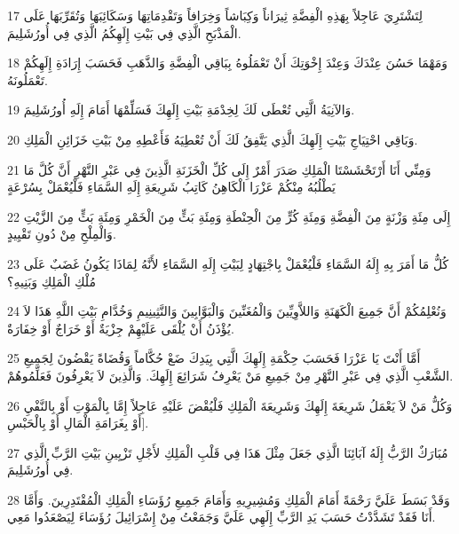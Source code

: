 \par 17 لِتَشْتَرِيَ عَاجِلاً بِهَذِهِ الْفِضَّةِ ثِيرَاناً وَكِبَاشاً وَخِرَافاً وَتَقْدِمَاتِهَا وَسَكَائِبَهَا وَتُقَرِّبَهَا عَلَى الْمَذْبَحِ الَّذِي فِي بَيْتِ إِلَهِكُمُ الَّذِي فِي أُورُشَلِيمَ.
\par 18 وَمَهْمَا حَسُنَ عِنْدَكَ وَعِنْدَ إِخْوَتِكَ أَنْ تَعْمَلُوهُ بِبَاقِي الْفِضَّةِ وَالذَّهَبِ فَحَسَبَ إِرَادَةِ إِلَهِكُمْ تَعْمَلُونَهُ.
\par 19 وَالآنِيَةُ الَّتِي تُعْطَى لَكَ لِخِدْمَةِ بَيْتِ إِلَهِكَ فَسَلِّمْهَا أَمَامَ إِلَهِ أُورُشَلِيمَ.
\par 20 وَبَاقِي احْتِيَاجِ بَيْتِ إِلَهِكَ الَّذِي يَتَّفِقُ لَكَ أَنْ تُعْطِيَهُ فَأَعْطِهِ مِنْ بَيْتِ خَزَائِنِ الْمَلِكِ.
\par 21 وَمِنِّي أَنَا أَرْتَحْشَسْتَا الْمَلِكِ صَدَرَ أَمْرٌ إِلَى كُلِّ الْخَزَنَةِ الَّذِينَ فِي عَبْرِ النَّهْرِ أَنَّ كُلَّ مَا يَطْلُبُهُ مِنْكُمْ عَزْرَا الْكَاهِنُ كَاتِبُ شَرِيعَةِ إِلَهِ السَّمَاءِ فَلْيُعْمَلْ بِسُرْعَةٍ
\par 22 إِلَى مِئَةِ وَزْنَةٍ مِنَ الْفِضَّةِ وَمِئَةِ كُرٍّ مِنَ الْحِنْطَةِ وَمِئَةِ بَثٍّ مِنَ الْخَمْرِ وَمِئَةِ بَثٍّ مِنَ الزَّيْتِ وَالْمِلْحِ مِنْ دُونِ تَقْيِيدٍ.
\par 23 كُلُّ مَا أَمَرَ بِهِ إِلَهُ السَّمَاءِ فَلْيُعْمَلْ بِاجْتِهَادٍ لِبَيْتِ إِلَهِ السَّمَاءِ لأَنَّهُ لِمَاذَا يَكُونُ غَضَبٌ عَلَى مُلْكِ الْمَلِكِ وَبَنِيهِ؟
\par 24 وَنُعْلِمُكُمْ أَنَّ جَمِيعَ الْكَهَنَةِ وَاللاَّوِيِّينَ وَالْمُغَنِّينَ وَالْبَوَّابِينَ وَالنَّثِينِيمِ وَخُدَّامِ بَيْتِ اللَّهِ هَذَا لاَ يُؤْذَنُ أَنْ يُلْقَى عَلَيْهِمْ جِزْيَةٌ أَوْ خَرَاجٌ أَوْ خِفَارَةٌ.
\par 25 أَمَّا أَنْتَ يَا عَزْرَا فَحَسَبَ حِكْمَةِ إِلَهِكَ الَّتِي بِيَدِكَ ضَعْ حُكَّاماً وَقُضَاةً يَقْضُونَ لِجَمِيعِ الشَّعْبِ الَّذِي فِي عَبْرِ النَّهْرِ مِنْ جَمِيعِ مَنْ يَعْرِفُ شَرَائِعَ إِلَهِكَ. وَالَّذِينَ لاَ يَعْرِفُونَ فَعَلِّمُوهُمْ.
\par 26 وَكُلُّ مَنْ لاَ يَعْمَلُ شَرِيعَةَ إِلَهِكَ وَشَرِيعَةَ الْمَلِكِ فَلْيُقْضَ عَلَيْهِ عَاجِلاً إِمَّا بِالْمَوْتِ أَوْ بِالنَّفْيِ أَوْ بِغَرَامَةِ الْمَالِ أَوْ بِالْحَبْسِ].
\par 27 مُبَارَكٌ الرَّبُّ إِلَهُ آبَائِنَا الَّذِي جَعَلَ مِثْلَ هَذَا فِي قَلْبِ الْمَلِكِ لأَجْلِ تَزْيِينِ بَيْتِ الرَّبِّ الَّذِي فِي أُورُشَلِيمَ.
\par 28 وَقَدْ بَسَطَ عَلَيَّ رَحْمَةً أَمَامَ الْمَلِكِ وَمُشِيرِيهِ وَأَمَامَ جَمِيعِ رُؤَسَاءِ الْمَلِكِ الْمُقْتَدِرِينَ. وَأَمَّا أَنَا فَقَدْ تَشَدَّدْتُ حَسَبَ يَدِ الرَّبِّ إِلَهِي عَلَيَّ وَجَمَعْتُ مِنْ إِسْرَائِيلَ رُؤَسَاءَ لِيَصْعَدُوا مَعِي.

